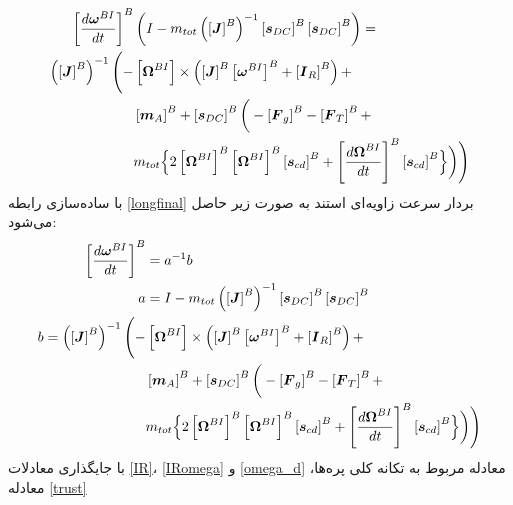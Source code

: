 \begin{equation}\label{longfinal}
	\begin{split}
		\left[\dfrac{d\boldsymbol\omega^{BI}}{dt}\right]^B  & \left(
		I - m_{tot} \left(\left[\boldsymbol J\right]^B\right)^{-1}
		\left[\boldsymbol s_{DC}\right]^B
		\left[\boldsymbol s_{DC}\right]^B\right) = \\
		\left(\left[\boldsymbol J\right]^B\right)^{-1}\Bigg(
		-&\left[\boldsymbol\Omega^{BI}\right]\times\left(
		\left[\boldsymbol J\right]^B\left[\boldsymbol\omega^{BI}\right]^B
		+\left[\boldsymbol I_R\right]^B\right) + \\
		&\left[\boldsymbol m_A\right]^B+\left[\boldsymbol s_{DC}\right]^B
		\bigg(-\left[\boldsymbol F_g\right]^B
		-\left[\boldsymbol F_T\right]^B+ \\
		&m_{tot}\Bigl\{2
		\left[\boldsymbol\Omega^{BI}\right]^B
		\left[\boldsymbol\Omega^{BI}\right]^B
		\left[\boldsymbol s_{cd}\right]^B+
		\left[\dfrac{d\boldsymbol\Omega^{BI}}{dt}\right]^B
		\left[\boldsymbol s_{cd}\right]^B
		\Bigr\}\bigg)\Bigg)		
	\end{split}
\end{equation}
با ساده‌سازی رابطه \ref{longfinal}  بردار سرعت زاویه‌ای استند به صورت زیر حاصل می‌شود:
\begin{equation}\label{finaltorquefinal}
	\begin{split}
		\left[\dfrac{d\boldsymbol\omega^{BI}}{dt}\right]^B &= a^{-1}b\\
		a &= I - m_{tot}\left(\left[\boldsymbol J\right]^B\right)^{-1}
		\left[\boldsymbol s_{DC}\right]^B
		\left[\boldsymbol s_{DC}\right]^B\\
		b = \left(\left[\boldsymbol J\right]^B\right)^{-1}\Bigg(
		-&\left[\boldsymbol\Omega^{BI}\right]\times\left(
		\left[\boldsymbol J\right]^B\left[\boldsymbol\omega^{BI}\right]^B
		+\left[\boldsymbol I_R\right]^B\right) + \\
		&\left[\boldsymbol m_A\right]^B+\left[\boldsymbol s_{DC}\right]^B
		\bigg(-\left[\boldsymbol F_g\right]^B
		-\left[\boldsymbol F_T\right]^B+ \\
		&m_{tot}\Bigl\{2
		\left[\boldsymbol\Omega^{BI}\right]^B
		\left[\boldsymbol\Omega^{BI}\right]^B
		\left[\boldsymbol s_{cd}\right]^B+
		\left[\dfrac{d\boldsymbol\Omega^{BI}}{dt}\right]^B
		\left[\boldsymbol s_{cd}\right]^B
		\Bigr\}\bigg)\Bigg)		
	\end{split}
\end{equation}
با جایگذاری معادلات
 \ref{IR}،
 \ref{IRomega} و
 \ref{omega_d}
 معادله مربوط به تکانه کلی پره‌ها، 
 معادله \ref{trust}
